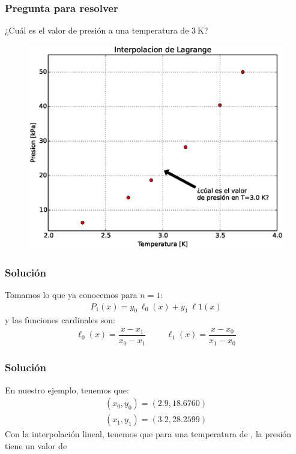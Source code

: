 \documentclass[12pt]{beamer}
\begin{document}
\begin{frame}
\frametitle{Pregunta para resolver}
¿Cuál es el valor de presión a una temperatura de $\SI{3}{\kelvin}$?
\begin{figure}
	\centering
	\includegraphics[scale=0.4]{Imagenes/grafica03.eps} 
\end{figure}
\end{frame}
\begin{frame}[fragile]
\frametitle{Solución}
Tomamos lo que ya conocemos para $n = 1$:
\pause
\begin{align*}
P_{1} (x) = y_{0} \: \ell_{0} (x) + y_{1} \: \ell{1} (x)
\end{align*}
\pause
y las funciones cardinales son:
\pause
\begin{align*}
\ell_{0} (x) = \dfrac{x - x_{1}}{x_{0} - x_{1}} \hspace{1cm} \ell_{1} (x) = \dfrac{x - x_{0}}{x_{1} - x_{0}}
\end{align*}
\end{frame}
\begin{frame}[fragile]
\frametitle{Solución}
En nuestro ejemplo, tenemos que:
\pause
\begin{align*}
(x_{0}, y_{0}) = (2.9, 18.6760) \\[1em]
(x_{1}, y_{1}) = (3.2, 28.2599)
\end{align*}
\pause
Con la interpolación lineal, tenemos que para una temperatura de , la presión tiene un valor de 
\end{frame}
\end{document}
